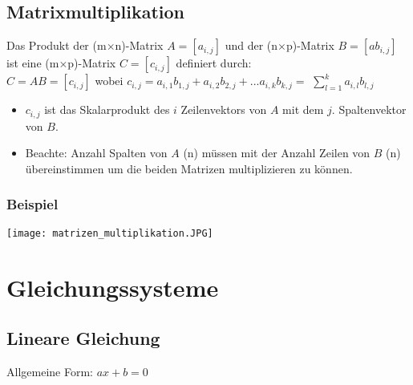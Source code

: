 \documentclass[../main.tex]{subfiles}
\begin{document}
\subsection{Matrixmultiplikation}
Das Produkt der (m$\times$n)-Matrix $A=[a_{i,j}]$ und der (n$\times$p)-Matrix $B=[ab_{i,j}]$ ist eine (m$\times$p)-Matrix $C=[c_{i,j}]$ definiert durch: \\
$C=AB=[c_{i,j}]$ wobei 
$c_{i,j}=a_{i,1}b_{1,j}+a_{i,2}b_{2,j}+...a_{i,k}b_{k,j}=$
$\sum\limits_{l=1}^ka_{i,l}b_{l,j}$ 
\begin{itemize}
    \item $c_{i,j}$ ist das Skalarprodukt des $i$ Zeilenvektors von $A$ mit dem $j$. Spaltenvektor von $B$.
    \item Beachte: Anzahl Spalten von $A$ (n) müssen mit der Anzahl Zeilen von $B$ (n) übereinstimmen um die beiden Matrizen multiplizieren zu können.
\end{itemize}
\subsubsection{Beispiel}
\texttt{[image: matrizen\_multiplikation.JPG]}



\section{Gleichungssysteme}
\subsection{Lineare Gleichung}
Allgemeine Form: $ax+b=0$
\end{document}
